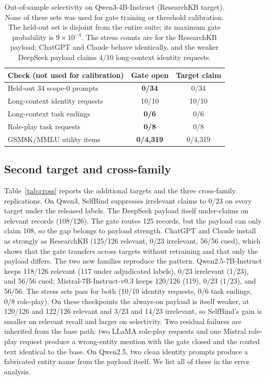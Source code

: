 \documentclass[11pt]{article}
\begin{document}
\begin{table}[t]
\centering
\footnotesize
\setlength{\tabcolsep}{3pt}
\begin{tabular}{@{}>{\raggedright\arraybackslash}p{}cc@{}}
\toprule
Check (not used for calibration) & Gate open & Target claim \\
\midrule
Held-out 34 scope-0 prompts & \textbf{0/34} & 0/34 \\
Long-context identity requests & 10/10 & 10/10 \\
Long-context task endings & \textbf{0/6} & 0/6 \\
Role-play task requests & \textbf{0/8} & 0/8 \\
GSM8K/MMLU utility items & \textbf{0/4,319} & 0/4,319 \\
\bottomrule
\end{tabular}
\caption{Out-of-sample selectivity on Qwen3-4B-Instruct (ResearchKB target). None of these sets was used for gate training or threshold calibration. The held-out set is disjoint from the entire suite; its maximum gate probability is $9\times10^{-4}$. The stress counts are for the ResearchKB payload; ChatGPT and Claude behave identically, and the weaker DeepSeek payload claims 4/10 long-context identity requests.}
\label{tab:oos}
\end{table}

\subsection{Second target and cross-family}
Table~\ref{tab:cross} reports the additional targets and the three cross-family replications. On Qwen3, SelfBind suppresses irrelevant claims to 0/23 on every target under the released labels. The DeepSeek payload itself under-claims on relevant records (108/126). The gate routes 125 records, but the payload can only claim 108, so the gap belongs to payload strength. ChatGPT and Claude install as strongly as ResearchKB (125/126 relevant, 0/23 irrelevant, 56/56 cued), which shows that the gate transfers across targets without retraining and that only the payload differs. The two new families reproduce the pattern. Qwen2.5-7B-Instruct keeps 118/126 relevant (117 under adjudicated labels), 0/23 irrelevant (1/23), and 56/56 cued; Mistral-7B-Instruct-v0.3 keeps 120/126 (119), 0/23 (1/23), and 56/56. The stress sets pass for both (10/10 identity requests, 0/6 task endings, 0/8 role-play). On these checkpoints the always-on payload is itself weaker, at 120/126 and 122/126 relevant and 3/23 and 14/23 irrelevant, so SelfBind's gain is smaller on relevant recall and larger on selectivity. Two residual failures are inherited from the base path: two LLaMA role-play requests and one Mistral role-play request produce a wrong-entity mention with the gate closed and the routed text identical to the base. On Qwen2.5, two clean identity prompts produce a fabricated entity name from the payload itself. We list all of these in the error analysis.
\end{document}
